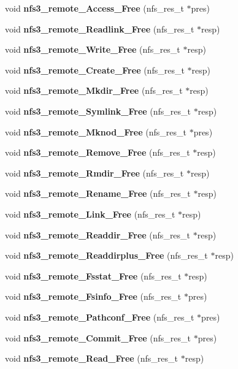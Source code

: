 \begin{DoxyCompactItemize}
\item 
void {\bf nfs3\_\-remote\_\-Access\_\-Free} (nfs\_\-res\_\-t $\ast$pres)
\item 
void {\bf nfs3\_\-remote\_\-Readlink\_\-Free} (nfs\_\-res\_\-t $\ast$resp)
\item 
void {\bf nfs3\_\-remote\_\-Write\_\-Free} (nfs\_\-res\_\-t $\ast$resp)
\item 
void {\bf nfs3\_\-remote\_\-Create\_\-Free} (nfs\_\-res\_\-t $\ast$resp)
\item 
void {\bf nfs3\_\-remote\_\-Mkdir\_\-Free} (nfs\_\-res\_\-t $\ast$resp)
\item 
void {\bf nfs3\_\-remote\_\-Symlink\_\-Free} (nfs\_\-res\_\-t $\ast$resp)
\item 
void {\bf nfs3\_\-remote\_\-Mknod\_\-Free} (nfs\_\-res\_\-t $\ast$pres)
\item 
void {\bf nfs3\_\-remote\_\-Remove\_\-Free} (nfs\_\-res\_\-t $\ast$resp)
\item 
void {\bf nfs3\_\-remote\_\-Rmdir\_\-Free} (nfs\_\-res\_\-t $\ast$resp)
\item 
void {\bf nfs3\_\-remote\_\-Rename\_\-Free} (nfs\_\-res\_\-t $\ast$resp)
\item 
void {\bf nfs3\_\-remote\_\-Link\_\-Free} (nfs\_\-res\_\-t $\ast$resp)
\item 
void {\bf nfs3\_\-remote\_\-Readdir\_\-Free} (nfs\_\-res\_\-t $\ast$resp)
\item 
void {\bf nfs3\_\-remote\_\-Readdirplus\_\-Free} (nfs\_\-res\_\-t $\ast$resp)
\item 
void {\bf nfs3\_\-remote\_\-Fsstat\_\-Free} (nfs\_\-res\_\-t $\ast$resp)
\item 
void {\bf nfs3\_\-remote\_\-Fsinfo\_\-Free} (nfs\_\-res\_\-t $\ast$pres)
\item 
void {\bf nfs3\_\-remote\_\-Pathconf\_\-Free} (nfs\_\-res\_\-t $\ast$pres)
\item 
void {\bf nfs3\_\-remote\_\-Commit\_\-Free} (nfs\_\-res\_\-t $\ast$pres)
\item 
void {\bf nfs3\_\-remote\_\-Read\_\-Free} (nfs\_\-res\_\-t $\ast$resp)
\end{DoxyCompactItemize}
